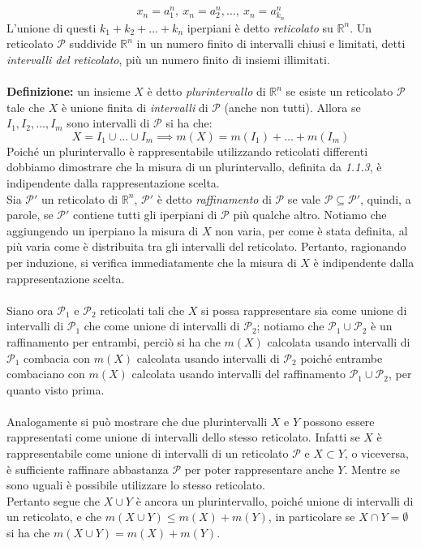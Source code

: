 \documentclass{article}
\numberwithin{equation}{subsection}
\begin{document}
\begin{equation*}
    x_n = a^n_1, \ x_n = a^n_2, \dots , \ x_n = a^n_{k_n} 
\end{equation*}
L'unione di questi $k_1 + k_2 + \dots + k_n$ iperpiani è detto \textit{reticolato} su $\mathbb{R}^n$. Un reticolato $\mathcal{P}$ suddivide $\mathbb{R}^n$ in un numero finito di intervalli chiusi e limitati, detti \textit{intervalli del reticolato}, più un numero finito di insiemi illimitati. \\ \\
\textbf{Definizione:} un insieme $X$ è detto \textit{plurintervallo} di $\mathbb{R}^n$ se esiste un reticolato $\mathcal{P}$ tale che $X$ è unione finita di \textit{intervalli} di $\mathcal{P}$ (anche non tutti). Allora se $I_1, I_2, \dots, I_m$ sono intervalli di $\mathcal{P}$ si ha che:
\begin{equation*}
    X = I_1 \cup \dots \cup I_m \implies m(X) = m(I_1) + \dots + m(I_m) 
\end{equation*}
Poiché un plurintervallo è rappresentabile utilizzando reticolati differenti dobbiamo dimostrare che la misura di un plurintervallo, definita da \textit{1.1.3}, è indipendente dalla rappresentazione scelta. \\
Sia $\mathcal{P}'$ un reticolato di $\mathbb{R}^n$, $\mathcal{P}'$ è detto \textit{raffinamento} di $\mathcal{P}$ se vale $\mathcal{P} \subseteq \mathcal{P}'$, quindi, a parole, se $\mathcal{P}'$ contiene tutti gli iperpiani di $\mathcal{P}$ più qualche altro. Notiamo che aggiungendo un iperpiano la misura di $X$ non varia, per come è stata definita, al più varia come è distribuita tra gli intervalli del reticolato. Pertanto, ragionando per induzione, si verifica immediatamente che la misura di $X$ è indipendente dalla rappresentazione scelta. \\ \\
Siano ora $\mathcal{P}_1$ e $\mathcal{P}_2$ reticolati tali che $X$ si possa rappresentare sia come unione di intervalli di $\mathcal{P}_1$ che come unione di intervalli di $\mathcal{P}_2$; notiamo che $\mathcal{P}_1 \cup \mathcal{P}_2$ è un raffinamento per entrambi, perciò si ha che $m(X)$ calcolata usando intervalli di $\mathcal{P}_1$ combacia con $m(X)$ calcolata usando intervalli di $\mathcal{P}_2$ poiché entrambe combaciano con $m(X)$ calcolata usando intervalli del raffinamento $\mathcal{P}_1 \cup \mathcal{P}_2$, per quanto visto prima. \\ \\
Analogamente si può mostrare che due plurintervalli $X$ e $Y$ possono essere rappresentati come unione di intervalli dello stesso reticolato. Infatti se $X$ è rappresentabile come unione di intervalli di un reticolato $\mathcal{P}$ e $X \subset Y$, o viceversa, è sufficiente raffinare abbastanza $\mathcal{P}$ per poter rappresentare anche $Y$. Mentre se sono uguali è possibile utilizzare lo stesso reticolato. \\
Pertanto segue che $X \cup Y$ è ancora un plurintervallo, poiché unione di intervalli di un reticolato, e che $m(X \cup Y) \leq m(X) + m(Y)$, in particolare se $X \cap Y = \emptyset$ si ha che $m(X \cup Y) = m(X) + m(Y)$.
\end{document}
